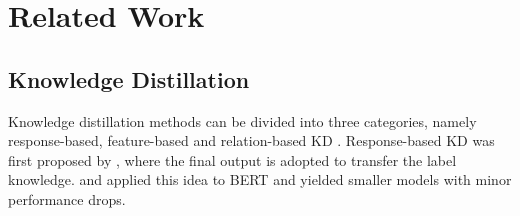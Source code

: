 \documentclass[11pt]{article}
\begin{document}
\section{Related Work}
\subsection{Knowledge Distillation}
Knowledge distillation methods can be divided into three categories, namely response-based, feature-based and relation-based KD \citep{gou2021knowledge}.
Response-based KD was first proposed by \citet{hinton2015distilling}, where the final output is adopted to transfer the label knowledge. 
\citet{sanh2019distilbert} and \citet{turc2019well} applied this idea to BERT and yielded smaller models with minor performance drops. 
\end{document}
